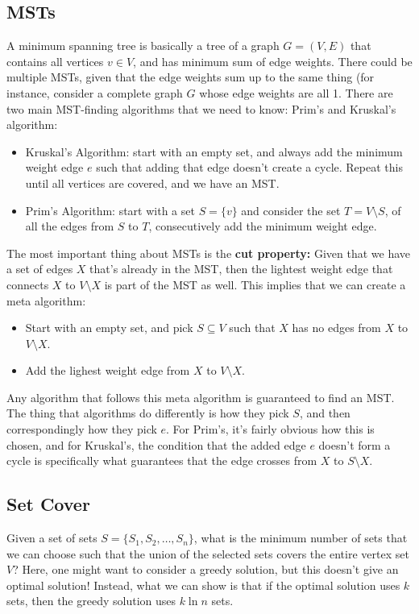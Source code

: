 \documentclass[10pt]{article}
\begin{document}
	\subsection{MSTs}
	A minimum spanning tree is basically a tree of a graph \( G = (V, E) \) that contains all vertices \( v \in V \), and 
	has minimum sum of edge weights. There could be multiple MSTs, given that the edge weights sum up to the same thing (for 
	instance, consider a complete graph \( G \) whose edge weights are all 1. There are two main MST-finding algorithms 
	that we need to know: Prim's and Kruskal's algorithm:
	\begin{itemize}
		\item Kruskal's Algorithm: start with an empty set, and always add the minimum weight edge \( e \) such that 
			adding that edge doesn't create a cycle. Repeat this until all vertices are covered, and we have an MST. 
		\item Prim's Algorithm: start with a set \( S = \{ v \}  \)  and consider the set \( T = V \setminus S \), of all the 
			edges from \( S \) to \( T \), consecutively add the minimum weight edge. 
	\end{itemize}
	The most important thing about MSTs is the \textbf{cut property:} Given that we have a set of edges \( X \) that's already 
	in the MST, then the lightest weight edge that connects \( X \) to \( V \setminus X \) is part of the MST as well. This 
	implies that we can create a meta algorithm:

	\begin{tcolorbox}
		\begin{itemize}
			\item Start with an empty set, and pick \( S \subseteq V \) such that \( X \) has no edges from \( X \) to 
				\( V \setminus X \). 
			\item Add the lighest weight edge from \( X  \) to \( V \setminus X \). 
		\end{itemize}
	\end{tcolorbox}
	Any algorithm that follows this meta algorithm is guaranteed to find an MST. The thing that algorithms do differently is 
	how they pick \( S \), and then correspondingly how they pick \( e \). For Prim's, it's fairly obvious how this is chosen, and 
	for Kruskal's, the condition that the added edge \( e \) doesn't form a cycle is specifically what guarantees
	that the edge crosses from \( X \) to \( S \setminus X \). 

	\subsection{Set Cover}
	Given a set of sets \( S = \{S_1, S_2, \dots, S_n\}  \), what is the minimum number of sets that we can choose such that
	the union of the selected sets covers the entire vertex set \( V \)? Here, one might want to consider a greedy solution, but this 
	doesn't give an optimal solution! Instead, what we can show is that if the optimal solution uses \( k \) sets, then the 
	greedy solution uses \( k \ln n\) sets. 
\end{document}

